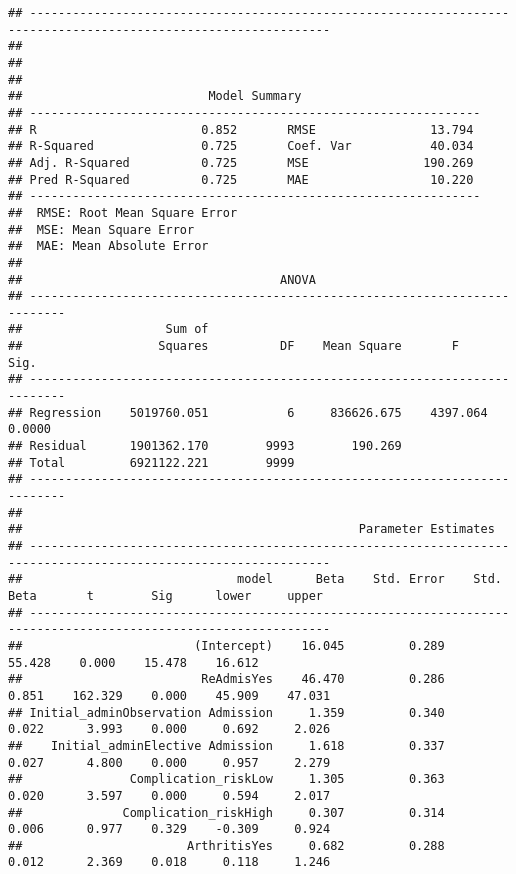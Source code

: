 \documentclass[
]{article}
\begin{document}
\begin{verbatim}
## ----------------------------------------------------------------------------------------------------------------
## 
## 
## 
##                          Model Summary                          
## ---------------------------------------------------------------
## R                       0.852       RMSE                13.794 
## R-Squared               0.725       Coef. Var           40.034 
## Adj. R-Squared          0.725       MSE                190.269 
## Pred R-Squared          0.725       MAE                 10.220 
## ---------------------------------------------------------------
##  RMSE: Root Mean Square Error 
##  MSE: Mean Square Error 
##  MAE: Mean Absolute Error 
## 
##                                    ANOVA                                    
## ---------------------------------------------------------------------------
##                    Sum of                                                  
##                   Squares          DF    Mean Square       F          Sig. 
## ---------------------------------------------------------------------------
## Regression    5019760.051           6     836626.675    4397.064    0.0000 
## Residual      1901362.170        9993        190.269                       
## Total         6921122.221        9999                                      
## ---------------------------------------------------------------------------
## 
##                                               Parameter Estimates                                                
## ----------------------------------------------------------------------------------------------------------------
##                              model      Beta    Std. Error    Std. Beta       t        Sig      lower     upper 
## ----------------------------------------------------------------------------------------------------------------
##                        (Intercept)    16.045         0.289                  55.428    0.000    15.478    16.612 
##                         ReAdmisYes    46.470         0.286        0.851    162.329    0.000    45.909    47.031 
## Initial_adminObservation Admission     1.359         0.340        0.022      3.993    0.000     0.692     2.026 
##    Initial_adminElective Admission     1.618         0.337        0.027      4.800    0.000     0.957     2.279 
##               Complication_riskLow     1.305         0.363        0.020      3.597    0.000     0.594     2.017 
##              Complication_riskHigh     0.307         0.314        0.006      0.977    0.329    -0.309     0.924 
##                       ArthritisYes     0.682         0.288        0.012      2.369    0.018     0.118     1.246 

\end{verbatim}
\end{document}

